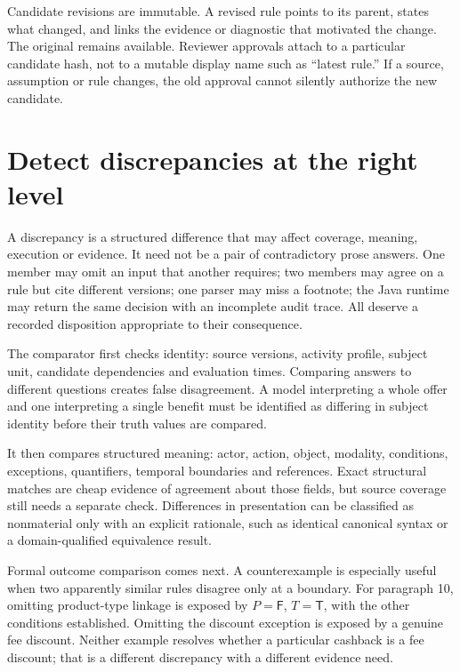 \documentclass[12pt,a4paper,oneside,openany]{book}
\newcommand{\True}{\mathsf{T}}
\newcommand{\False}{\mathsf{F}}
\begin{document}
Candidate revisions are immutable. A revised rule points to its parent, states
what changed, and links the evidence or diagnostic that motivated the change.
The original remains available. Reviewer approvals attach to a particular
candidate hash, not to a mutable display name such as ``latest rule.'' If a
source, assumption or rule changes, the old approval cannot silently authorize
the new candidate.

\section{Detect discrepancies at the right level}
\label{merge:M06:05}


A discrepancy is a structured difference that may affect coverage, meaning,
execution or evidence. It need not be a pair of contradictory prose answers.
One member may omit an input that another requires; two members may agree on a
rule but cite different versions; one parser may miss a footnote; the Java
runtime may return the same decision with an incomplete audit trace. All deserve
a recorded disposition appropriate to their consequence.

The comparator first checks identity: source versions, activity profile, subject
unit, candidate dependencies and evaluation times. Comparing answers to different
questions creates false disagreement. A model interpreting a whole offer and one
interpreting a single benefit must be identified as differing in subject identity
before their truth values are compared.

It then compares structured meaning: actor, action, object, modality, conditions,
exceptions, quantifiers, temporal boundaries and references. Exact structural
matches are cheap evidence of agreement about those fields, but source coverage
still needs a separate check. Differences in presentation can be classified as
nonmaterial only with an explicit rationale, such as identical canonical syntax
or a domain-qualified equivalence result.

Formal outcome comparison comes next. A counterexample is especially useful when
two apparently similar rules disagree only at a boundary. For paragraph 10,
omitting product-type linkage is exposed by $P=\False$, $T=\True$, with the other
conditions established. Omitting the discount exception is exposed by a genuine
fee discount. Neither example resolves whether a particular cashback is a fee
discount; that is a different discrepancy with a different evidence need.
\end{document}
